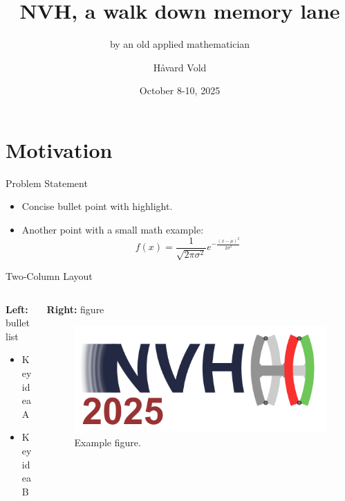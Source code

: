 \documentclass[aspectratio=169,10pt]{beamer} \mode<presentation>
\title{NVH, a walk down memory lane}
\subtitle{by an old applied mathematician}
\author{H\aa vard Vold}
\institute{Vold LLC}
\date{October 8-10, 2025}
\begin{document}
\maketitle

\section[Outline]{}


\section{Motivation}

\begin{frame}{Problem Statement}
\begin{itemize}
  \item Concise bullet point with \alert{highlight}.
  \item Another point with a small math example:
    \[
      f(x) = \frac{1}{\sqrt{2\pi\sigma^2}} e^{-\frac{(x-\mu)^2}{2\sigma^2}}
    \]
\end{itemize}
\end{frame}

\begin{frame}{Two-Column Layout}
\begin{columns}[T,onlytextwidth]
  \begin{column}{0.52\textwidth}
    \textbf{Left:} bullet list
    \begin{itemize}
      \item Key idea A
      \item Key idea B
    \end{itemize}
  \end{column}
  \begin{column}{0.44\textwidth}
    \textbf{Right:} figure
    \begin{figure}
      \centering
      \includegraphics[width=\linewidth]{logo.png}%
      \caption{Example figure.}
    \end{figure}
  \end{column}
\end{columns}
\end{frame}
\end{document}
